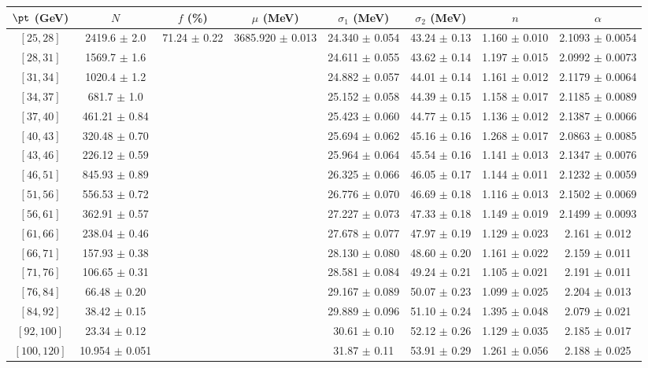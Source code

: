 \begin{tabular}{c||c|c|c|c|c|c|c}
$\pt$ (GeV) & $N$ & $f$ (\%) & $\mu$ (MeV) & $\sigma_1$ (MeV) & $\sigma_2$ (MeV) & $n$ & $\alpha$ \\
\hline
$[25, 28]$ & 2419.6 $\pm$ 2.0 & \multirow{17}{*}{71.24 $\pm$ 0.22} & \multirow{17}{*}{3685.920 $\pm$ 0.013} & 24.340 $\pm$ 0.054 & 43.24 $\pm$ 0.13 & 1.160 $\pm$ 0.010 & 2.1093 $\pm$ 0.0054\\
$[28, 31]$ & 1569.7 $\pm$ 1.6 &  &  & 24.611 $\pm$ 0.055 & 43.62 $\pm$ 0.14 & 1.197 $\pm$ 0.015 & 2.0992 $\pm$ 0.0073\\
$[31, 34]$ & 1020.4 $\pm$ 1.2 &  &  & 24.882 $\pm$ 0.057 & 44.01 $\pm$ 0.14 & 1.161 $\pm$ 0.012 & 2.1179 $\pm$ 0.0064\\
$[34, 37]$ & 681.7 $\pm$ 1.0 &  &  & 25.152 $\pm$ 0.058 & 44.39 $\pm$ 0.15 & 1.158 $\pm$ 0.017 & 2.1185 $\pm$ 0.0089\\
$[37, 40]$ & 461.21 $\pm$ 0.84 &  &  & 25.423 $\pm$ 0.060 & 44.77 $\pm$ 0.15 & 1.136 $\pm$ 0.012 & 2.1387 $\pm$ 0.0066\\
$[40, 43]$ & 320.48 $\pm$ 0.70 &  &  & 25.694 $\pm$ 0.062 & 45.16 $\pm$ 0.16 & 1.268 $\pm$ 0.017 & 2.0863 $\pm$ 0.0085\\
$[43, 46]$ & 226.12 $\pm$ 0.59 &  &  & 25.964 $\pm$ 0.064 & 45.54 $\pm$ 0.16 & 1.141 $\pm$ 0.013 & 2.1347 $\pm$ 0.0076\\
$[46, 51]$ & 845.93 $\pm$ 0.89 &  &  & 26.325 $\pm$ 0.066 & 46.05 $\pm$ 0.17 & 1.144 $\pm$ 0.011 & 2.1232 $\pm$ 0.0059\\
$[51, 56]$ & 556.53 $\pm$ 0.72 &  &  & 26.776 $\pm$ 0.070 & 46.69 $\pm$ 0.18 & 1.116 $\pm$ 0.013 & 2.1502 $\pm$ 0.0069\\
$[56, 61]$ & 362.91 $\pm$ 0.57 &  &  & 27.227 $\pm$ 0.073 & 47.33 $\pm$ 0.18 & 1.149 $\pm$ 0.019 & 2.1499 $\pm$ 0.0093\\
$[61, 66]$ & 238.04 $\pm$ 0.46 &  &  & 27.678 $\pm$ 0.077 & 47.97 $\pm$ 0.19 & 1.129 $\pm$ 0.023 & 2.161 $\pm$ 0.012\\
$[66, 71]$ & 157.93 $\pm$ 0.38 &  &  & 28.130 $\pm$ 0.080 & 48.60 $\pm$ 0.20 & 1.161 $\pm$ 0.022 & 2.159 $\pm$ 0.011\\
$[71, 76]$ & 106.65 $\pm$ 0.31 &  &  & 28.581 $\pm$ 0.084 & 49.24 $\pm$ 0.21 & 1.105 $\pm$ 0.021 & 2.191 $\pm$ 0.011\\
$[76, 84]$ & 66.48 $\pm$ 0.20 &  &  & 29.167 $\pm$ 0.089 & 50.07 $\pm$ 0.23 & 1.099 $\pm$ 0.025 & 2.204 $\pm$ 0.013\\
$[84, 92]$ & 38.42 $\pm$ 0.15 &  &  & 29.889 $\pm$ 0.096 & 51.10 $\pm$ 0.24 & 1.395 $\pm$ 0.048 & 2.079 $\pm$ 0.021\\
$[92, 100]$ & 23.34 $\pm$ 0.12 &  &  & 30.61 $\pm$ 0.10 & 52.12 $\pm$ 0.26 & 1.129 $\pm$ 0.035 & 2.185 $\pm$ 0.017\\
$[100, 120]$ & 10.954 $\pm$ 0.051 &  &  & 31.87 $\pm$ 0.11 & 53.91 $\pm$ 0.29 & 1.261 $\pm$ 0.056 & 2.188 $\pm$ 0.025\\
\end{tabular}
